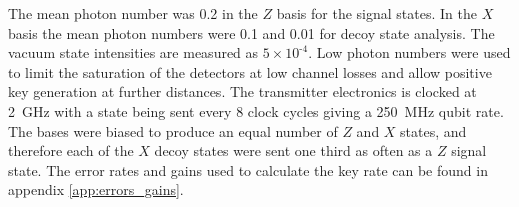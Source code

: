 The mean photon number was 0.2 in the $Z$ basis for the signal states. In the $X$ basis the mean photon numbers were 0.1 and 0.01 for decoy state analysis. The vacuum state intensities are measured as $\text{5}\times \text{10}^\text{-4}$. Low photon numbers were used to limit the saturation of the detectors at low channel losses and allow positive key generation at further distances. The transmitter electronics is clocked at \SI{2}{GHz} with a state being sent every 8 clock cycles giving a \SI{250}{MHz} qubit rate. The bases were biased to produce an equal number of $Z$ and $X$ states, and therefore each of the $X$ decoy states were sent one third as often as a $Z$ signal state. The error rates and gains used to calculate the key rate can be found in appendix \ref{app:errors_gains}.

%
%

%


